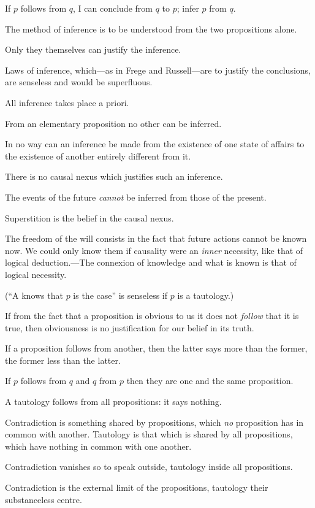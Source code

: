 {If $p$ follows from $q$, I can conclude from $q$ to $p$;
infer $p$ from $q$.

The method of inference is to be understood
from the two propositions alone.

Only they themselves can justify the inference.

Laws of inference, which---as in Frege and
Russell---are to justify the conclusions, are senseless
and would be superfluous.}


{All inference takes place a priori.}


{From an elementary proposition no other can
be inferred.}


{In no way can an inference be made from the
existence of one state of affairs to the existence of
another entirely different from it.}


{There is no causal nexus which justifies such
an inference.}


{The events of the future \emph{cannot} be inferred from
those of the present.

Superstition is the belief in the causal
nexus.}


{The freedom of the will consists in the fact that
future actions cannot be known now. We could
only know them if causality were an \emph{inner} necessity,
like that of logical deduction.---The connexion
of knowledge and what is known is that of logical
necessity.

(``A knows that $p$ is the case'' is senseless if $p$
is a tautology.)}


{If from the fact that a proposition is obvious
to us it does not \emph{follow} that it is true, then obviousness
is no justification for our belief in its truth.}


{If a proposition follows from another, then the
latter says more than the former, the former less
than the latter.}


{If $p$ follows from $q$ and $q$ from $p$ then they are
one and the same proposition.}


{A tautology follows from all propositions: it
says nothing.}


{Contradiction is something shared by propositions,
which \emph{no} proposition has in common with
another. Tautology is that which is shared by
all propositions, which have nothing in common
with one another.

Contradiction vanishes so to speak outside,
tautology inside all propositions.

Contradiction is the external limit of the propositions,
tautology their substanceless centre.}


